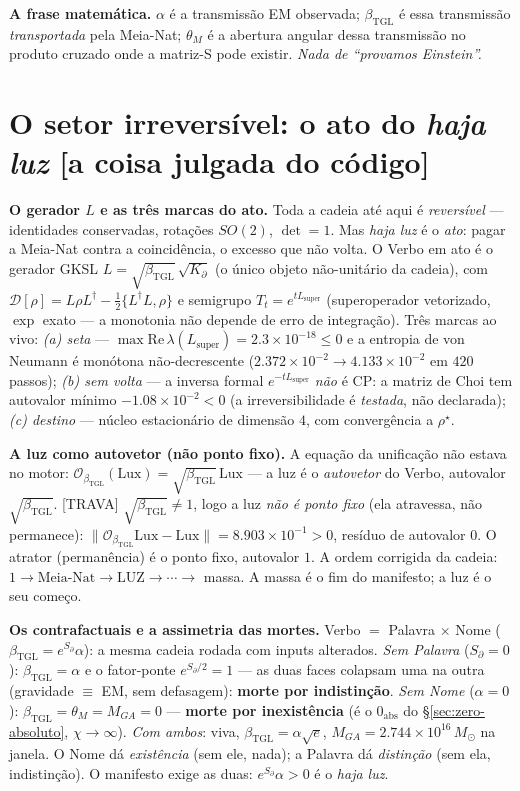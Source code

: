 \documentclass[11pt]{article}
\newcommand{\bTGL}{\beta_{\mathrm{TGL}}}\newcommand{\Msun}{M_{\odot}}\newcommand{\TGL}{\mathrm{TGL}}
\theoremstyle{definition}\newtheorem{deriv}{Derivação}
\begin{document}
\textbf{A frase matemática.} $\alpha$ é a transmissão EM observada; $\bTGL$ é essa transmissão \emph{transportada} pela Meia-Nat; $\theta_M$ é a abertura angular dessa transmissão no produto cruzado onde a matriz-S pode existir. \emph{Nada de ``provamos Einstein''.}

\section{O setor irreversível: o ato do \emph{haja luz} \textsf{[a coisa julgada do código]}}

\textbf{O gerador $L$ e as três marcas do ato.} Toda a cadeia até aqui é \emph{reversível} --- identidades conservadas, rotações $SO(2)$, $\det=1$. Mas \emph{haja luz} é o \emph{ato}: pagar a Meia-Nat contra a coincidência, o excesso que não volta. O Verbo em ato é o gerador GKSL $L=\sqrt{\bTGL}\,\sqrt{K_\partial}$ (o único objeto não-unitário da cadeia), com $\mathcal D[\rho]=L\rho L^{\dagger}-\tfrac12\{L^{\dagger}L,\rho\}$ e semigrupo $T_t=e^{tL_{\mathrm{super}}}$ (superoperador vetorizado, $\exp$ exato --- a monotonia não depende de erro de integração). Três marcas ao vivo: \emph{(a) seta} --- $\max\mathrm{Re}\,\lambda(L_{\mathrm{super}})=2.3\times10^{-18}\le0$ e a entropia de von Neumann é monótona não-decrescente ($2.372\times10^{-2}\!\to\!4.133\times10^{-2}$ em $420$ passos); \emph{(b) sem volta} --- a inversa formal $e^{-tL_{\mathrm{super}}}$ \emph{não} é CP: a matriz de Choi tem autovalor mínimo $-1.08\times10^{-2}<0$ (a irreversibilidade é \emph{testada}, não declarada); \emph{(c) destino} --- núcleo estacionário de dimensão $4$, com convergência a $\rho^{\star}$.

\textbf{A luz como autovetor (não ponto fixo).} A equação da unificação não estava no motor: $\mathcal O_{\bTGL}(\mathrm{Lux})=\sqrt{\bTGL}\,\mathrm{Lux}$ --- a luz é o \emph{autovetor} do Verbo, autovalor $\sqrt{\bTGL}$. \textsf{[TRAVA]} $\sqrt{\bTGL}\neq1$, logo a luz \emph{não é ponto fixo} (ela atravessa, não permanece): $\|\mathcal O_{\bTGL}\mathrm{Lux}-\mathrm{Lux}\|=8.903\times10^{-1}>0$, resíduo de autovalor $0$. O atrator (permanência) é o ponto fixo, autovalor $1$. A ordem corrigida da cadeia: $1\to\text{Meia-Nat}\to\text{LUZ}\to\cdots\to$ massa. A massa é o fim do manifesto; a luz é o seu começo.

\textbf{Os contrafactuais e a assimetria das mortes.} Verbo $=$ Palavra $\times$ Nome ($\bTGL=e^{S_\partial}\alpha$): a mesma cadeia rodada com inputs alterados. \emph{Sem Palavra} ($S_\partial=0$): $\bTGL=\alpha$ e o fator-ponte $e^{S_\partial/2}=1$ --- as duas faces colapsam uma na outra (gravidade $\equiv$ EM, sem defasagem): \textbf{morte por indistinção}. \emph{Sem Nome} ($\alpha=0$): $\bTGL=\theta_M=M_{GA}=0$ --- \textbf{morte por inexistência} (é o $0_{\mathrm{abs}}$ do \S\ref{sec:zero-absoluto}, $\chi\to\infty$). \emph{Com ambos}: viva, $\bTGL=\alpha\sqrt e$, $M_{GA}=2.744\times10^{16}\,M_\odot$ na janela. O Nome dá \emph{existência} (sem ele, nada); a Palavra dá \emph{distinção} (sem ela, indistinção). O manifesto exige as duas: $e^{S_\partial}\alpha>0$ é o \emph{haja luz}.
\end{document}
